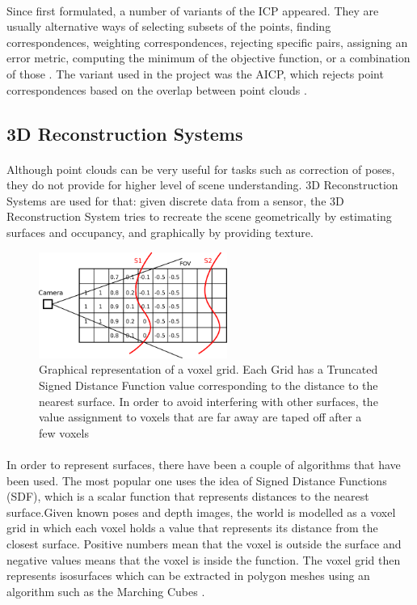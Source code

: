 \documentclass[12pt]{article}
\begin{document}
	\paragraph{}
	Since first formulated, a number of variants of the ICP appeared. They are usually alternative ways of selecting subsets of the points, finding correspondences, weighting correspondences, rejecting specific pairs, assigning an error metric, computing the minimum of the objective function, or a combination of those \cite{ICPVariants}. The variant used in the project was the AICP, which rejects point correspondences based on the overlap between point clouds \cite{7989547}.
	
	\subsection{3D Reconstruction Systems}
	\paragraph{}
	Although point clouds can be very useful for tasks such as correction of poses, they do not provide for higher level of scene understanding. 3D Reconstruction Systems are used for that: given discrete data from a sensor, the 3D Reconstruction System tries to recreate the scene geometrically by estimating surfaces and occupancy, and graphically by providing texture.
	
	\begin{figure}
		\centering
		\includegraphics[width=0.55\textwidth]{TSDF}
		\caption[t]{Graphical representation of a voxel grid. Each Grid has a Truncated Signed Distance Function value corresponding to the distance to the nearest surface. In order to avoid interfering with other surfaces, the value assignment to voxels that are far away are taped off after a few voxels}
		\label{fig:TSDF}
	\end{figure}
	
	\paragraph{}
	In order to represent surfaces, there have been a couple of algorithms that have been used. The most popular one uses the idea of Signed Distance Functions (SDF), which is a scalar function that represents distances to the nearest surface.Given known poses and depth images, the world is modelled as a voxel grid in which each voxel holds  a value that represents its distance from the closest surface. Positive numbers mean that the voxel is outside the surface and negative values means that the voxel is inside the function. The voxel grid then represents isosurfaces which can be extracted in polygon meshes using an algorithm such as the Marching Cubes \cite{marchingcubes}.
	
\end{document}
